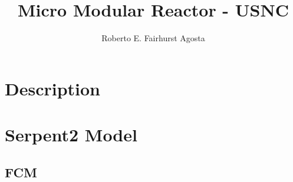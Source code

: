 \documentclass[11pt,letterpaper]{article}
\title{Micro Modular Reactor - USNC}
\author{Roberto E. Fairhurst Agosta}
\begin{document}

\section{Description}	

\section{Serpent2 Model}

\subsection{FCM}
\label{sub:FCM}
\end{document}
